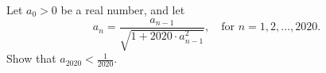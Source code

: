 Let $a_0>0$ be a real number, and let
$$a_n=\frac{a_{n-1}}{\sqrt{1+2020\cdot a_{n-1}^2}}, \quad \textrm{for } n=1,2,\ldots ,2020.$$Show that $a_{2020}<\frac1{2020}$.